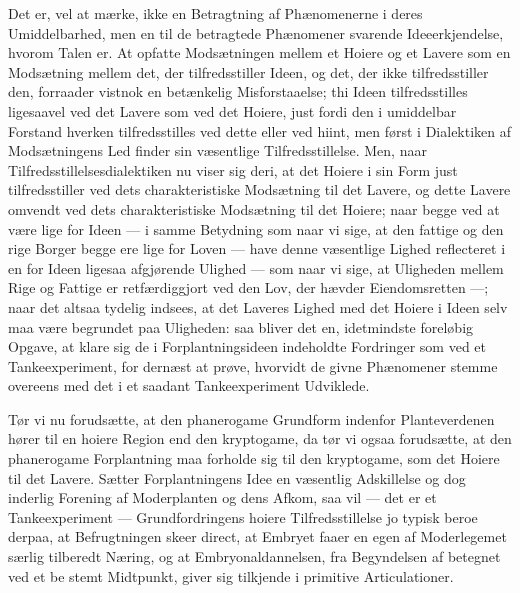\documentclass[11pt]{book}
\newcommand{\opage}[1]{\marginnote{\footnotesize\textit{[#1]}}}
\begin{document}
Det er, vel at mærke, ikke en Betragtning af Phænomenerne i deres
Umiddelbarhed, men en til de betragtede Phænomener svarende
Ideeerkjendelse, hvorom Talen er. At opfatte Modsætningen mellem et
Hoiere og et Lavere som en
\opage{297} \setcounter{footnote}{0}%
Modsætning mellem det, der tilfredsstiller Ideen, og det, der ikke
tilfredsstiller den, forraader vistnok en betænkelig Misforstaaelse; thi
Ideen tilfredsstilles ligesaavel ved det Lavere som ved det Hoiere, just
fordi den i umiddelbar Forstand hverken tilfredsstilles ved dette eller
ved hiint, men først i Dialektiken af Modsætningens Led finder sin
væsentlige Tilfredsstillelse. Men, naar Tilfredsstillelsesdialektiken nu
viser sig deri, at det Hoiere i sin Form just tilfredsstiller ved dets
charakteristiske Modsætning til det Lavere, og dette Lavere omvendt ved
dets charakteristiske Modsætning til det Hoiere; naar begge ved at være
lige for Ideen --- i samme Betydning som naar vi sige, at den fattige og
den rige Borger begge ere lige for Loven --- have denne væsentlige
Lighed reflecteret i en for Ideen ligesaa afgjørende Ulighed --- som
naar vi sige, at Uligheden mellem Rige og Fattige er retfærdiggjort ved
den Lov, der hævder Eiendomsretten ---; naar det altsaa tydelig indsees,
at det Laveres Lighed med det Hoiere i Ideen selv maa være begrundet paa
Uligheden: saa bliver det en, idetmindste foreløbig Opgave, at klare sig
de i Forplantningsideen indeholdte Fordringer som ved et
Tankeexperiment, for dernæst at prøve, hvorvidt de givne Phænomener
stemme overeens med det i et saadant Tankeexperiment Udviklede.

Tør vi nu forudsætte, at den phanerogame Grundform indenfor
Planteverdenen hører til en hoiere Region end den kryptogame, da tør vi
ogsaa forudsætte, at den phanerogame Forplantning maa forholde sig til
den kryptogame, som det Hoiere til det Lavere. Sætter Forplantningens
Idee en væsentlig Adskillelse og dog inderlig Forening af Moderplanten
og dens Afkom, saa vil --- det er et Tankeexperiment ---
Grundfordringens hoiere Tilfredsstillelse jo typisk beroe derpaa, at
Befrugtningen skeer direct, at Embryet faaer en egen af Moderlegemet
særlig tilberedt Næring, og at Embryonaldannelsen, fra Begyndelsen af
betegnet ved et be\-%
\opage{298} \setcounter{footnote}{0}%
stemt Midtpunkt, giver sig tilkjende i primitive Articulationer.
\end{document}
